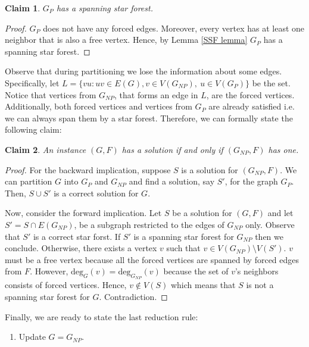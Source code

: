 \documentclass[en]{pracamgr}
\newtheorem{claim}{Claim}
\newcommand{\degree}[2]{\textrm{deg}_{#1}(#2)}
\begin{document}
\begin{claim}
	$G_P$ has a spanning star forest.
\end{claim}

\begin{proof}
	$G_P$ does not have any forced edges. Moreover, every vertex has at least one neighbor that is also a free vertex. Hence, by Lemma \ref{SSF lemma} $G_P$ has a spanning star forest.
\end{proof}

Observe that during partitioning we lose the information about some edges. Specifically, let $L= \{vu: uv \in E(G), v \in V(G_{NP}),\ u \in V(G_P)\}$ be the set. Notice that vertices from $G_{NP}$, that forms an edge in $L$, are the forced vertices. Additionally, both forced vertices and vertices from $G_P$ are already satisfied i.e. we can always span them by a star forest. Therefore, we can formally state the following claim:

\begin{claim}\label{GNP partition}
	An instance $(G,F)$ has a solution if and only if $(G_{NP},F)$ has one.
\end{claim}

\begin{proof}
	For the backward implication, suppose $S$ is a solution for $(G_{NP},F)$. We can partition $G$ into $G_P$ and $G_{NP}$ and find a solution, say $S'$, for the graph $G_P$. Then, $S \cup S'$ is a correct solution for $G$.
	
	Now, consider the forward implication. Let $S$ be a solution for $(G, F)$ and let $S' = S \cap E(G_{NP})$, be a subgraph restricted to the edges of $G_{NP}$ only. Observe that $S'$ is a correct star forst. If $S'$ is a spanning star forest for $G_{NP}$ then we conclude. Otherwise, there exists a vertex $v$ such that $v \in V(G_{NP}) \setminus V(S')$. $v$ must be a free vertex because all the forced vertices are spanned by forced edges from $F$. However, $\degree{G}{v}=\degree{G_{NP}}{v}$ because the set of $v$'s neighbors consists of forced vertices. Hence, $v \notin V(S)$ which means that $S$ is not a spanning star forest for $G$. Contradiction.
\end{proof}

Finally, we are ready to state the last reduction rule:

\begin{enumerate}[leftmargin=*,label=\textbf{Reduction \arabic{enumi}},resume,wide, labelwidth=!, labelindent=0pt]
	\item Update $G=G_{NP}$.
\end{enumerate}
\end{document}
